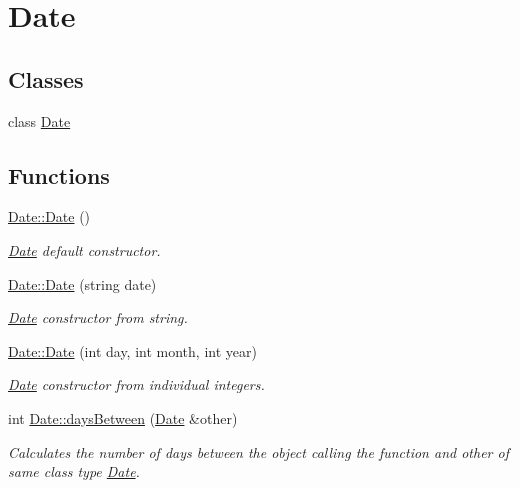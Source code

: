 \hypertarget{group___date}{}\section{Date}
\label{group___date}
\subsection*{Classes}
\begin{DoxyCompactItemize}
\item 
class \hyperlink{class_date}{Date}
\end{DoxyCompactItemize}
\subsection*{Functions}
\begin{DoxyCompactItemize}
\item 
\mbox{\label{group___date_ga4e59ed4ba66eec61c27460c5d09fa1bd}} 
\hyperlink{group___date_ga4e59ed4ba66eec61c27460c5d09fa1bd}{Date\+::\+Date} ()
\begin{DoxyCompactList}\small\item\em \hyperlink{class_date}{Date} default constructor. \end{DoxyCompactList}\item 
\hyperlink{group___date_ga5532efafed41fd5f8e013a61313200dc}{Date\+::\+Date} (string date)
\begin{DoxyCompactList}\small\item\em \hyperlink{class_date}{Date} constructor from string. \end{DoxyCompactList}\item 
\hyperlink{group___date_gab1ad19969fa570605a6b0cd32b0da822}{Date\+::\+Date} (int day, int month, int year)
\begin{DoxyCompactList}\small\item\em \hyperlink{class_date}{Date} constructor from individual integers. \end{DoxyCompactList}\item 
int \hyperlink{group___date_ga9168133cb290c4f378699037ef7b5d4a}{Date\+::days\+Between} (\hyperlink{class_date}{Date} \&other)
\begin{DoxyCompactList}\small\item\em Calculates the number of days between the object calling the function and other of same class type \hyperlink{class_date}{Date}. \end{DoxyCompactList}\item 

\end{DoxyCompactItemize}
